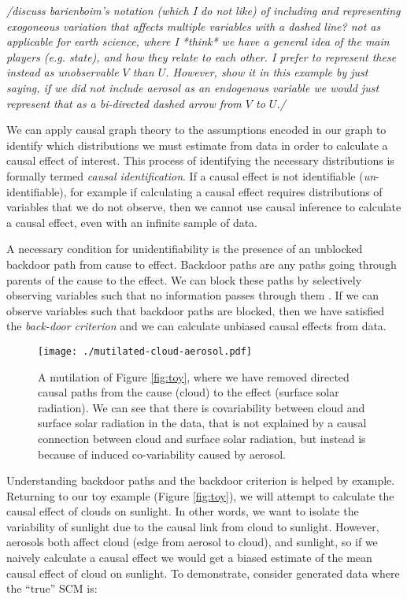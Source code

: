 \documentclass[12pt]{article}
\begin{document}
\textit{/discuss barienboim's notation (which I do not like) of
  including and representing exogoneous variation that affects
  multiple variables with a dashed line? not as applicable for earth
  science, where I *think* we have a general idea of the main players
  (e.g. state), and how they relate to each other. I prefer to
  represent these instead as unobservable $V$ than $U$. However, show
  it in this example by just saying, if we did not include aerosol as
  an endogenous variable  we would just represent that as a
  bi-directed dashed arrow from $V$ to $U$./}

We can apply causal graph theory
\citep[e.g.,][]{pearl1995causal,shpitser2006} to the assumptions
encoded in our graph to identify which distributions we must estimate
from data in order to calculate a causal effect of interest. This
process of identifying the necessary distributions is formally termed
\emph{causal identification}. If a causal effect is not identifiable
(\emph{un}-identifiable), for example if calculating a causal effect
requires distributions of variables that we do not observe, then we
cannot use causal inference to calculate a causal effect, even with an
infinite sample of data.


A necessary condition for unidentifiability is the presence of an
unblocked backdoor path from cause to effect. Backdoor paths are any
paths going through parents of the cause to the effect. We can block
these paths by selectively observing variables such that no
information passes through them \citep{geiger-d-sep}. If we can
observe variables such that backdoor paths are blocked, then we have
satisfied the \emph{back-door criterion} \citep{pearl2009} and we can
calculate unbiased causal effects from data.

\begin{figure}
  \noindent\texttt{[image: ./mutilated-cloud-aerosol.pdf]}\\
  \caption{A mutilation of Figure \ref{fig:toy}, where we have removed
    directed causal paths from the cause (cloud) to the effect (surface
    solar radiation). We can see that there is covariability between
    cloud and surface solar radiation in the data, that is not
    explained by a causal connection between cloud and surface solar
    radiation, but instead is because of induced co-variability caused
    by aerosol.}
  \label{fig:mutilated-toy}
\end{figure}

Understanding backdoor paths and the backdoor criterion is helped by
example. Returning to our toy example (Figure \ref{fig:toy}), we will
attempt to calculate the causal effect of clouds on sunlight. In other
words, we want to isolate the variability of sunlight due to the
causal link from cloud to sunlight. However, aerosols both affect
cloud (edge from aerosol to cloud), and sunlight, so if we naively
calculate a causal effect we would get a biased estimate of the mean
causal effect of cloud on sunlight. To demonstrate, consider generated
data where the ``true'' SCM is:
\end{document}
